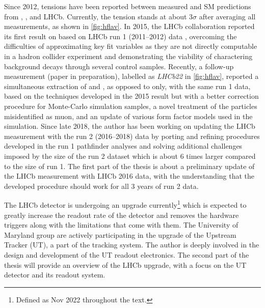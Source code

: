 Since 2012, tensions have been reported between measured \RDX and SM
predictions from \babar, \belle, and LHCb.
Currently, the tension stands at about $3 \sigma$ after averaging all
measurements,
as shown in \cref{fig:hflav}.
In 2015, the LHCb collaboration reported its first result on \RDst
based on LHCb run 1 (2011--2012) data
\cite{PhysRevLett.115.111803},
overcoming the difficulties of approximating key fit variables
as they are not directly computable in a hadron collider experiment
and demonstrating the viability of charactering background decays through
several control samples.
Recently, a follow-up measurement (paper in preparation),
labelled as \emph{LHCb22} in \cref{fig:hflav},
reported a simultaneous extraction of \RD and \RDst,
as opposed to \RDst only,
with the same run 1 data,
based on the techniques developed in the 2015 result but with
a better correction procedure for Monte-Carlo simulation samples,
a novel treatment of the particles misidentified as muon,
and an update of various form factor models used in the simulation.
Since late 2018,
the author has been working on updating the LHCb \RDX measurement with the run 2
(2016--2018) data by porting and refining procedures developed in the run 1
pathfinder analyses and solving additional challenges imposed by the size of the
run 2 dataset which is about 6 times larger compared to the size of run 1.
The first part of the thesis is about a preliminary update of the LHCb \RDX
measurement with LHCb 2016 data,
with the understanding that the developed procedure should work for all 3 years
of run 2 data.

The LHCb detector is undergoing an upgrade currently\footnote{
    Defined as Nov 2022 throughout the text.
} which is expected to greatly increase
the readout rate of the detector and removes the hardware triggers along
with the limitations that come with them.
The University of Maryland group are actively participating in the upgrade
of the Upstream Tracker (UT), a part of the tracking system.
The author is deeply involved in the design and development of the UT readout
electronics.
The second part of the thesis will provide an overview of the LHCb upgrade, with
a focus on the UT detector and its readout system.

